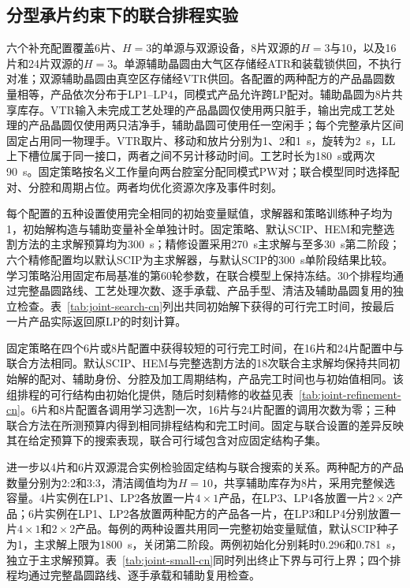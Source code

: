 \documentclass[final,5p,times,twocolumn]{elsarticle}
\begin{document}
\subsection{分型承片约束下的联合排程实验}
\label{sec:joint-evidence-cn}

六个补充配置覆盖6片、$H=3$的单源与双源设备，8片双源的$H=3$与10，以及16片和24片双源的$H=3$。单源辅助晶圆由大气区存储经ATR和装载锁供回，不执行对准；双源辅助晶圆由真空区存储经VTR供回。各配置的两种配方的产品晶圆数量相等，产品依次分布于LP1--LP4，同模式产品允许跨LP配对。辅助晶圆为8片共享库存。VTR输入未完成工艺处理的产品晶圆仅使用两只脏手，输出完成工艺处理的产品晶圆仅使用两只洁净手，辅助晶圆可使用任一空闲手；每个完整承片区间固定占用同一物理手。VTR取片、移动和放片分别为1、2和1~s，旋转为2~s，LL上下槽位属于同一接口，两者之间不另计移动时间。工艺时长为180~s或两次90~s。固定策略按名义工作量向两台腔室分配同模式PW对；联合模型同时选择配对、分腔和周期占位。两者均优化资源次序及事件时刻。

每个配置的五种设置使用完全相同的初始变量赋值，求解器和策略训练种子均为1，初始解构造与辅助变量补全单独计时。固定策略、默认SCIP、HEM和完整选割方法的主求解预算均为300~s；精修设置采用270~s主求解与至多30~s第二阶段；六个精修配置均以默认SCIP为主求解器，与默认SCIP的300~s单阶段结果比较。学习策略沿用固定布局基准的第60轮参数，在联合模型上保持冻结。30个排程均通过完整晶圆路线、工艺处理次数、逐手承载、产品手型、清洁及辅助晶圆复用的独立检查。表~\ref{tab:joint-search-cn}列出共同初始解下获得的可行完工时间，按最后一片产品实际返回原LP的时刻计算。


固定策略在四个6片或8片配置中获得较短的可行完工时间，在16片和24片配置中与联合方法相同。默认SCIP、HEM与完整选割方法的18次联合主求解均保持共同初始解的配对、辅助身份、分腔及加工周期结构，产品完工时间也与初始值相同。该组排程的可行结构由初始化提供，随后时刻精修的收益见表~\ref{tab:joint-refinement-cn}。6片和8片配置各调用学习选割一次，16片与24片配置的调用次数为零；三种联合方法在所测预算内得到相同排程结构和完工时间。固定与联合设置的差异反映其在给定预算下的搜索表现，联合可行域包含对应固定结构子集。

进一步以4片和6片双源混合实例检验固定结构与联合搜索的关系。两种配方的产品数量分别为2:2和3:3，清洁阈值均为$H=10$，共享辅助库存为8片，采用完整候选容量。4片实例在LP1、LP2各放置一片$4\times1$产品，在LP3、LP4各放置一片$2\times2$产品；6片实例在LP1、LP2各放置两种配方的产品各一片，在LP3和LP4分别放置一片$4\times1$和$2\times2$产品。每例的两种设置共用同一完整初始变量赋值，默认SCIP种子为1，主求解上限为1800~s，关闭第二阶段。两例初始化分别耗时0.296和0.781~s，独立于主求解预算。表~\ref{tab:joint-small-cn}同时列出终止下界与可行上界；四个排程均通过完整晶圆路线、逐手承载和辅助复用检查。
\end{document}
